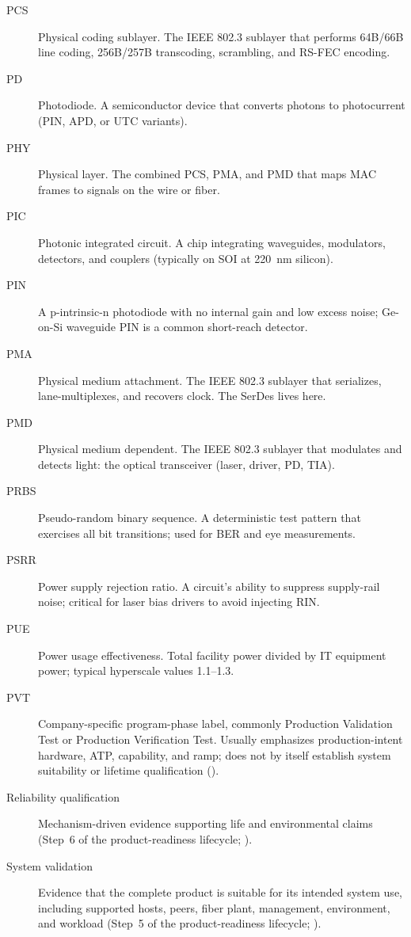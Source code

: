 \begin{description}
\item[PCS] Physical coding sublayer. The IEEE 802.3 sublayer that performs 64B/66B line coding, 256B/257B transcoding, scrambling, and RS-FEC encoding.
\item[PD] Photodiode. A semiconductor device that converts photons to photocurrent (PIN, APD, or UTC variants).
\item[PHY] Physical layer. The combined PCS, PMA, and PMD that maps MAC frames to signals on the wire or fiber.
\item[PIC] Photonic integrated circuit. A chip integrating waveguides, modulators, detectors, and couplers (typically on SOI at 220~nm silicon).
\item[PIN] A p-intrinsic-n photodiode with no internal gain and low excess noise; Ge-on-Si waveguide PIN is a common short-reach detector.
\item[PMA] Physical medium attachment. The IEEE 802.3 sublayer that serializes, lane-multiplexes, and recovers clock. The SerDes lives here.
\item[PMD] Physical medium dependent. The IEEE 802.3 sublayer that modulates and detects light: the optical transceiver (laser, driver, PD, TIA).
\item[PRBS] Pseudo-random binary sequence. A deterministic test pattern that exercises all bit transitions; used for BER and eye measurements.
\item[PSRR] Power supply rejection ratio. A circuit's ability to suppress supply-rail noise; critical for laser bias drivers to avoid injecting RIN.
\item[PUE] Power usage effectiveness. Total facility power divided by IT equipment power; typical hyperscale values 1.1--1.3.
\item[PVT] Company-specific program-phase label, commonly Production Validation Test or Production Verification Test. Usually emphasizes production-intent hardware, ATP, capability, and ramp; does not by itself establish system suitability or lifetime qualification ().
\item[Reliability qualification] Mechanism-driven evidence supporting life and environmental claims (Step~6 of the product-readiness lifecycle; ).
\item[System validation] Evidence that the complete product is suitable for its intended system use, including supported hosts, peers, fiber plant, management, environment, and workload (Step~5 of the product-readiness lifecycle; ).

\end{description}
